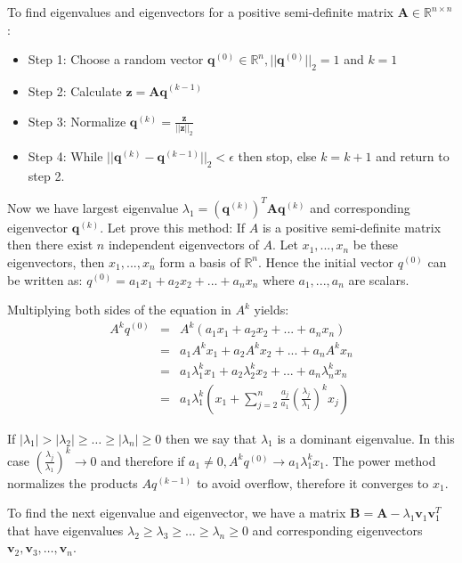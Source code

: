 \documentclass[a4paper, 12pt]{report}
\begin{document}
To find eigenvalues and eigenvectors for a positive semi-definite matrix $\mathbf{A} \in \mathbb{R}^{n \times n}$:
\begin{itemize}
\item Step 1: Choose a random vector $\mathbf{q}^{(0)} \in \mathbb{R}^n, ||\mathbf{q}^{(0)}||_2 = 1$ and $k = 1$
\item Step 2: Calculate $\mathbf{z} = \mathbf{Aq}^{(k-1)}$
\item Step 3: Normalize $\mathbf{q}^{(k)} = \frac{\mathbf{z}}{||\mathbf{z}||_2}$
\item Step 4: While $||\mathbf{q}^{(k)} - \mathbf{q}^{(k-1)}||_2 < \epsilon
$ then stop, else $k = k + 1$ and return to step 2.
\end{itemize}

Now we have largest eigenvalue $\lambda_1 = (\mathbf{q}^{(k)})^T\mathbf{A}\mathbf{q}^{(k)}$ and corresponding eigenvector $\mathbf{q}^{(k)}$. Let prove this method:
If $A$ is a positive semi-definite matrix then there exist $n$ independent eigenvectors of $A$. Let $x_1,...,x_n$ be these eigenvectors, then $x_1,...,x_n$ form a basis of $\mathbb{R}^n$. Hence the initial vector $q^{(0)}$ can be written as: $q^{(0)} = a_1x_1 + a_2x_2 + ... + a_nx_n$ where $a_1,..., a_n$ are scalars.

Multiplying both sides of the equation in $A^k$ yields:
\begin{eqnarray*}
A^kq^{(0)} &=& A^k(a_1x_1 + a_2x_2 + ... + a_nx_n) \\
&=& a_1A^kx_1 + a_2A^kx_2 + ... + a_nA^kx_n \\
&=& a_1\lambda_1^kx_1 + a_2\lambda_2^kx_2 + ... + a_n\lambda_n^kx_n \\
&=& a_1\lambda_1^k(x_1 +\sum_{j=2}^{n}\frac{a_j}{a_1}(\frac{\lambda_j}{\lambda_1})^kx_j)  
\end{eqnarray*}

If $|\lambda_1| > |\lambda_2| \geq \dots \geq |\lambda_n| \geq 0$ then we say that $\lambda_1$ is a dominant eigenvalue. In this case $(\frac{\lambda_j}{\lambda_1})^k \to 0$ and therefore if $a_1 \neq 0, A^kq^{(0)} \to a_1\lambda_1^kx_1$. The power method normalizes the products $Aq^{(k-1)}$ to avoid overflow, therefore it converges to $x_1$.

To find the next eigenvalue and eigenvector, we have a matrix $\mathbf{B} = \mathbf{A} - \lambda_1 \mathbf{v}_1 \mathbf{v}_1^T$ that have eigenvalues $\lambda_2 \geq \lambda_3 \geq \dots \geq \lambda_n \geq 0$ and corresponding eigenvectors $\mathbf{v}_2, \mathbf{v}_3, \dots, \mathbf{v}_n$.
\end{document}
